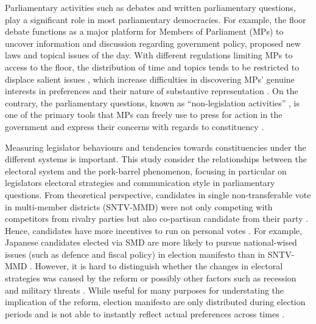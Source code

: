 Parliamentary activities such as debates and written parliamentary questions, play a significant role in most parliamentary democracies. For example, the floor debate functions as a major platform for Members of Parliament (MPs) to uncover information and discussion regarding government policy, proposed new laws and topical issues of the day. With different regulations limiting MPs to access to the floor, the distribution of time and topics tends to be restricted to displace salient issues \citep[e.g., ][]{Back2019b, Martin2011}, which increase difficulties in discovering MPs' genuine interests in preferences \citep{Martin2011, Saalfeld2011, Russo2021} and their nature of substantive representation \citep{Kolpinskaya2017}. On the contrary, the parliamentary questions, known as ``non-legislation activities'' \citep{Martin2017}, is one of the primary tools that MPs can freely use to press for action in the government and express their concerns with regards to constituency \citep{Russo2021, Saalfeld2011,Martin2011}. 

Measuring legislator behaviours and tendencies towards constituencies under the different systems is important. This study consider the relationships between the electoral system and the pork-barrel phenomenon, focusing in particular on legislators electoral strategies and communication style in parliamentary questions. From theoretical perspective, candidates in single non-transferable vote in multi-member districts (SNTV-MMD) were not only competing with competitors from rivalry parties but also co-partisan candidate from their party \citep{Carey1995}. Hence, candidates have more incentives to run on personal votes \citep{Cain1987, Carey1995}. For example, Japanese candidates elected via SMD are more likely to pursue national-wised issues (such as defence and fiscal policy) in election manifesto than in SNTV-MMD \citep{Catalinac2016}. However, it is hard to distinguish whether the changes in electoral strategies was caused by the reform or possibly other factors such as recession and military threats \citep{Ishima2020}. While useful for many purposes for understating the implication of the reform, election manifesto are only distributed during election periods and is not able to instantly reflect actual preferences across times \citep{Martin2011,Martin2017}.

